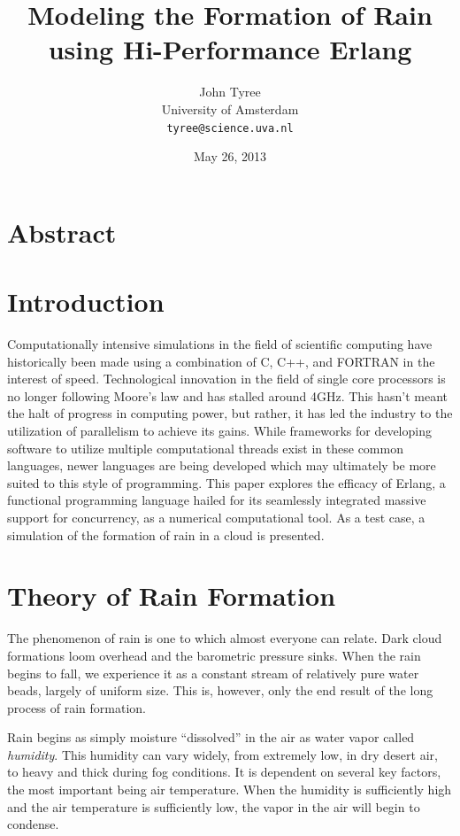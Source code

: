 \documentclass[twocolumn,a4paper,10pt]{article}
\title{Modeling the Formation of Rain using Hi-Performance Erlang}
\author{John Tyree\\
University of Amsterdam\\
\texttt{tyree@science.uva.nl}}
\date{May 26, 2013}
\begin{document}
\maketitle
\section{Abstract}
\section{Introduction}

Computationally intensive simulations in the field of scientific computing have
historically been made using a combination of C, C++, and FORTRAN in the
interest of speed. Technological innovation in the field of single core
processors is no longer following Moore's law and has stalled around 4GHz. This
hasn't meant the halt of progress in computing power, but rather, it has led the
industry to the utilization of parallelism to achieve its gains. While
frameworks for developing software to utilize multiple computational threads
exist in these common languages, newer languages are being developed which may
ultimately be more suited to this style of programming. This paper explores the
efficacy of Erlang, a functional programming language hailed for its seamlessly
integrated massive support for concurrency, as a numerical computational tool. As a
test case, a simulation of the formation of rain in a cloud is presented.

\section{Theory of Rain Formation}

The phenomenon of rain is one to which almost everyone can relate. Dark cloud
formations loom overhead and the barometric pressure sinks. When the rain begins
to fall, we experience it as a constant stream of relatively pure water beads,
largely of uniform size. This is, however, only the end result of the long process of
rain formation.

Rain begins as simply moisture ``dissolved'' in the air as water vapor called
\emph{humidity}.  This humidity can vary widely, from extremely low, in dry
desert air, to heavy and thick during fog conditions. It is dependent on several
key factors, the most important being air temperature. When the humidity is
sufficiently high and the air temperature is sufficiently low, the vapor in the
air will begin to condense.
\end{document}
